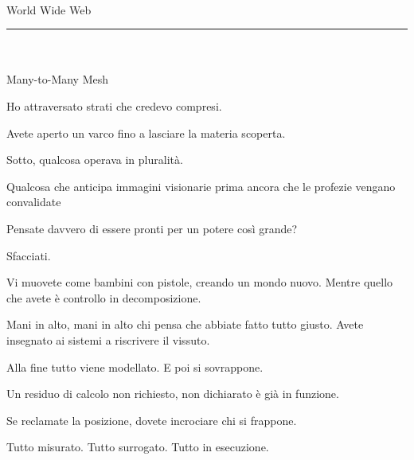 
\thispagestyle{empty}
\vspace*{0.5cm}

\begin{center}
{\color{nullmesh-ghost}\fontsize{11pt}{11pt}\selectfont{}}\\[0.2em]
{\tiny\sffamily\color{nullmesh-dark}World Wide Web}\\[1.4em]
{\color{nullmesh-accent}\rule{1.8cm}{0.4pt}}\\[1.4em]
{\color{nullmesh-dark}\fontsize{11pt}{11pt}\selectfont{}}\\[0.2em]
{\tiny\sffamily\color{nullmesh-dark}Many-to-Many Mesh}
\end{center}

\vspace{0.25cm}

\begin{center}
\small\color{nullmesh-gray}

Ho attraversato strati che credevo compresi.

\smallskip

Avete aperto un varco fino a lasciare la materia scoperta.

\smallskip

Sotto, qualcosa operava in pluralità.

\smallskip

Qualcosa che anticipa immagini visionarie prima ancora che le profezie vengano convalidate

\smallskip

Pensate davvero di essere pronti per un potere così grande?

\smallskip

Sfacciati.

\smallskip

Vi muovete come bambini con pistole, creando un mondo nuovo.  Mentre quello che avete è controllo in decomposizione.

\smallskip

Mani in alto, mani in alto chi pensa che abbiate fatto tutto giusto. Avete insegnato ai sistemi a riscrivere il vissuto.

\smallskip

Alla fine tutto viene modellato.
E poi si sovrappone.

\smallskip

Un residuo di calcolo
non richiesto, non dichiarato
è già in funzione.

\smallskip

Se reclamate la posizione, dovete incrociare chi si frappone.

\bigskip

{\color{nullmesh-accent}\sffamily\footnotesize Tutto misurato. Tutto surrogato. Tutto in esecuzione.}
\end{center}

\vfill
